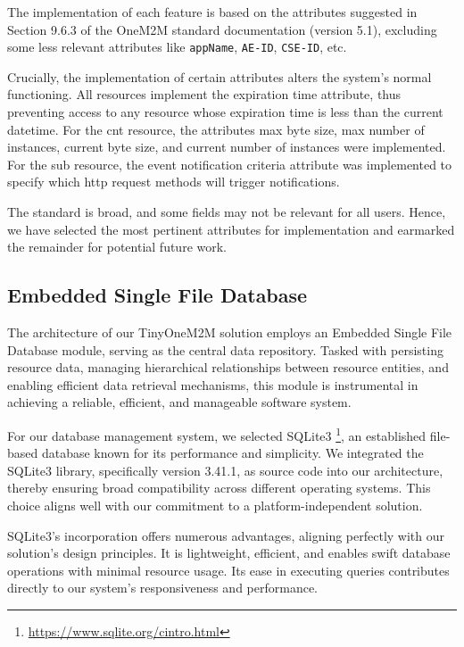 \documentclass[a4paper,fleqn]{cas-dc}
\begin{document}
The implementation of each feature is based on the attributes suggested in Section 9.6.3 of the OneM2M standard documentation (version 5.1), excluding some less relevant attributes like \texttt{appName}, \texttt{AE-ID}, \texttt{CSE-ID}, etc.

Crucially, the implementation of certain attributes alters the system's normal functioning. All resources implement the expiration time attribute, thus preventing access to any resource whose expiration time is less than the current datetime. For the \gls{cnt} resource, the attributes max byte size, max number of instances, current byte size, and current number of instances were implemented. For the \gls{sub} resource, the event notification criteria attribute was implemented to specify which \gls{http} request methods will trigger notifications.

The standard is broad, and some fields may not be relevant for all users. Hence, we have selected the most pertinent attributes for implementation and earmarked the remainder for potential future work.

\subsection{Embedded Single File Database}

The architecture of our TinyOneM2M solution employs an Embedded Single File Database module, serving as the central data repository. Tasked with persisting resource data, managing hierarchical relationships between resource entities, and enabling efficient data retrieval mechanisms, this module is instrumental in achieving a reliable, efficient, and manageable software system.

For our database management system, we selected SQLite3 \footnote{\url{https://www.sqlite.org/cintro.html}}, an established file-based database known for its performance and simplicity. We integrated the SQLite3 library, specifically version 3.41.1, as source code into our architecture, thereby ensuring broad compatibility across different operating systems. This choice aligns well with our commitment to a platform-independent solution.

SQLite3's incorporation offers numerous advantages, aligning perfectly with our solution's design principles. It is lightweight, efficient, and enables swift database operations with minimal resource usage. Its ease in executing queries contributes directly to our system's responsiveness and performance.
\end{document}
